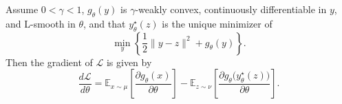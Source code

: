 \documentclass[10pt,a4paper]{amsart}
\begin{document}
\begin{lemma}
\label{lem:no_implicit_diff}
Assume $0 < \gamma < 1$, $g_\theta(y)$ is $\gamma$-weakly convex, continuously differentiable in $y$, and L-smooth in $\theta$, and that $y_\theta^\star(z)$ is the unique minimizer of
\begin{equation}
\min_y \left\{ \frac{1}{2}\|y - z\|^2 + g_\theta(y) \right\}.
\end{equation}
Then the gradient of $\mathcal{L}$ is given by
\begin{equation}
\label{eq:gradient_formula}
\frac{d\mathcal{L}}{d\theta}
=
\mathbb{E}_{x \sim \mu}
\left[
\frac{\partial g_\theta(x)}{\partial \theta}
\right]
-
\mathbb{E}_{z \sim \nu}
\left[
\frac{\partial g_\theta\big(y^\star_\theta(z)\big)}{\partial \theta}
\right].
\end{equation}
\end{lemma}
\end{document}
